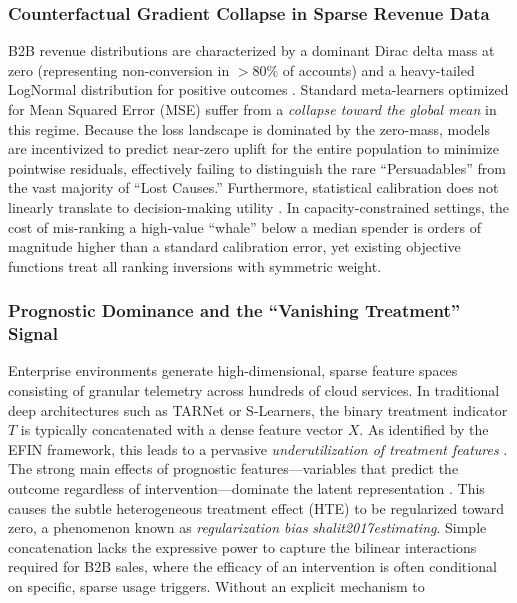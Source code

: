 \documentclass[runningheads]{llncs}
\begin{document}
\subsubsection{Counterfactual Gradient Collapse in Sparse Revenue Data}
B2B revenue distributions are characterized by a dominant Dirac delta mass at zero (representing non-conversion in $>80\%$ of accounts) and a heavy-tailed LogNormal distribution for positive outcomes \cite{rerum2024}. Standard meta-learners optimized for Mean Squared Error (MSE) \cite{kunzel2019metalearners,nie2021quasi} suffer from a \textit{collapse toward the global mean} in this regime. Because the loss landscape is dominated by the zero-mass, models are incentivized to predict near-zero uplift for the entire population to minimize pointwise residuals, effectively failing to distinguish the rare ``Persuadables'' from the vast majority of ``Lost Causes.'' Furthermore, statistical calibration does not linearly translate to decision-making utility \cite{dfcl2023}. In capacity-constrained settings, the cost of mis-ranking a high-value ``whale'' below a median spender is orders of magnitude higher than a standard calibration error, yet existing objective functions treat all ranking inversions with symmetric weight.

\subsubsection{Prognostic Dominance and the ``Vanishing Treatment'' Signal}
Enterprise environments generate high-dimensional, sparse feature spaces consisting of granular telemetry across hundreds of cloud services. In traditional deep architectures such as TARNet or S-Learners, the binary treatment indicator $T$ is typically concatenated with a dense feature vector $X$. As identified by the EFIN framework, this leads to a pervasive \textit{underutilization of treatment features} \cite{efin2023,sun2023robustness}. The strong main effects of prognostic features—variables that predict the outcome regardless of intervention—dominate the latent representation  \cite{yao2018representation,louizos2017causal}. This causes the subtle heterogeneous treatment effect (HTE) to be regularized toward zero, a phenomenon known as \textit{regularization bias} \textit{shalit2017estimating}. Simple concatenation lacks the expressive power to capture the bilinear interactions\cite{calder2003feature,efin2023,rendle2011fast,juan2016field,sun2023robustness} required for B2B sales, where the efficacy of an intervention is often conditional on specific, sparse usage triggers. Without an explicit mechanism to
\end{document}
